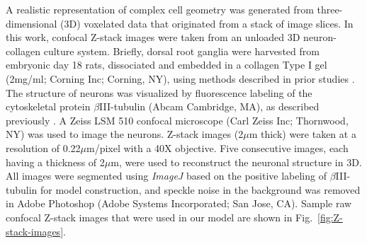 \documentclass[]{interact}
\begin{document}
A realistic representation of complex cell geometry was generated from three-dimensional (3D) voxelated data that originated from a stack of image slices. In this work, confocal Z-stack images were taken from an unloaded 3D neuron-collagen culture system. Briefly, dorsal root ganglia were harvested from embryonic day 18 rats, dissociated and embedded in a collagen Type I gel (2mg/ml; Corning Inc; Corning, NY), using methods described in prior studies \citep{Cullen:2012gu, Zhang:2016ga, Zhang:2017gr}. The structure of neurons was visualized by fluorescence labeling of the cytoskeletal protein $\beta$III-tubulin (Abcam Cambridge, MA), as described previously \citep{Zhang:2016ga, Zhang:2017gr}. A Zeiss LSM 510 confocal microscope (Carl Zeiss Inc; Thornwood, NY) was used to image the neurons.  Z-stack images (2$\mu$m thick) were taken at a resolution of 0.22$\mu$m/pixel with a 40X objective. Five consecutive images, each having a thickness of 2$\mu$m, were used to reconstruct the neuronal structure in 3D. All images were segmented using \textit{ImageJ} \citep{Schneider:2012dw} based on the positive labeling of $\beta$III-tubulin for model construction, and speckle noise in the background was removed in Adobe Photoshop (Adobe Systems Incorporated; San Jose, CA). Sample raw confocal Z-stack images that were used in our model are shown in Fig.\ \ref{fig:Z-stack-images}. 
%
\end{document}

